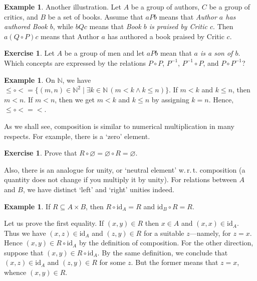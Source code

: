 \documentclass[12pt,notitlepage]{article}
\theoremstyle{plain}
\theoremstyle{definition}
\newtheorem{exc}[thm]{Exercise}
\newtheorem{exm}[thm]{Example}
\theoremstyle{plain}
\newcommand{\N}{\mathbb{N}}
\newcommand{\sbs}{\subseteq}
\newcommand{\void}{\varnothing}
\newcommand{\id}{\mathrm{id}}
\newcommand{\1}{\mathbf{1}}
\newcommand{\0}{\mathbf{0}}
\begin{document}
\begin{exm} Another illustration. Let $A$ be a group of authors, $C$ be a group of critics, and $B$ be a set of books. Assume that $a P b$ means that \emph{Author $a$ has authored Book $b$}, while  $b Q c$ means that \emph{Book $b$ is praised by Critic $c$}. Then  $a (Q \circ P) c$ means that Author $a$ has authored a book praised by Critic $c$.
\end{exm}

\begin{exc}
Let $A$ be a group of men and let $a P b$ mean that \emph{$a$ is a son of $b$}. Which concepts are expressed by the relations $P\circ P$, $P^{-1}$, $P^{-1} \circ P$, and $P \circ P^{-1}$?
\end{exc}

\begin{exm}
On $\N$, we have ${\leq}\circ{<} = \{(m,  n) \in \N^2 \mid \exists k\in \N\, (m < k \wedge k \leq n)\}$. If $m < k$ and $k \leq n$, then $m < n$. If $m < n$, then we get $m < k$ and $k \leq n$ by assigning $k = n$. Hence, ${\leq}\circ{<} = {<}$.
\end{exm}

As we shall see, composition is similar to numerical multiplication in many respects. For example, there is a `zero' element.
\begin{exc}
Prove that $R \circ \void = \void \circ R = \void$.
\end{exc}

Also, there is an analogue for unity, or `neutral element' w.\,r.\,t. composition (a quantity does not change if you multiply it by unity). For relations between $A$ and $B$, we have  distinct `left' and `right' unities indeed.
\begin{exm}
If $R \sbs A \times B$, then $R \circ \id_A = R$ and $\id_B \circ R = R$.

Let us prove the first equality. If $(x,y) \in R$ then $x \in A$ and $(x,x) \in \id_A$. Thus we have $(x,z) \in \id_A$ and $(z,y) \in R$ for a suitable $z$---namely, for $z = x$. Hence $(x,y) \in R \circ \id_A$ by the definition of composition. For the other direction, suppose that $(x,y) \in R \circ \id_A$. By the same definition, we conclude that $(x,z) \in \id_A$ and $(z,y) \in R$ for some $z$. But the former means that $z = x$, whence $(x,y) \in R$.
\end{exm}
\end{document}
